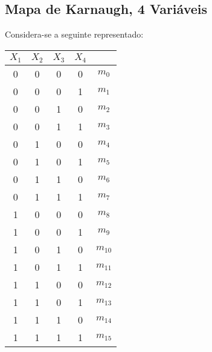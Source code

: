 \documentclass{article}
\begin{document}
        \subsection{Mapa de Karnaugh, 4 Variáveis}
            \begin{definition}
                Considera-se a seguinte representado:
                    \begin{multicols}{2}
                        \begin{table}[H]
                            \centering
                            \begin{tabular}[]{cccc|c}
                                $X_1$ & $X_2$ & $X_3$ & $X_4$& \\\hline
                                0     & 0     & 0     & 0    & $m_{0}$\\
                                0     & 0     & 0     & 1    & $m_{1}$\\
                                0     & 0     & 1     & 0    & $m_{2}$\\
                                0     & 0     & 1     & 1    & $m_{3}$\\
                                0     & 1     & 0     & 0    & $m_{4}$\\
                                0     & 1     & 0     & 1    & $m_{5}$\\
                                0     & 1     & 1     & 0    & $m_{6}$\\
                                0     & 1     & 1     & 1    & $m_{7}$\\
                                1     & 0     & 0     & 0    & $m_{8}$\\
                                1     & 0     & 0     & 1    & $m_{9}$\\
                                1     & 0     & 1     & 0    & $m_{10}$\\
                                1     & 0     & 1     & 1    & $m_{11}$\\
                                1     & 1     & 0     & 0    & $m_{12}$\\
                                1     & 1     & 0     & 1    & $m_{13}$\\
                                1     & 1     & 1     & 0    & $m_{14}$\\
                                1     & 1     & 1     & 1    & $m_{15}$\\\hline
                            \end{tabular}

\end{table}
\end{multicols}
\end{definition}
\end{document}

